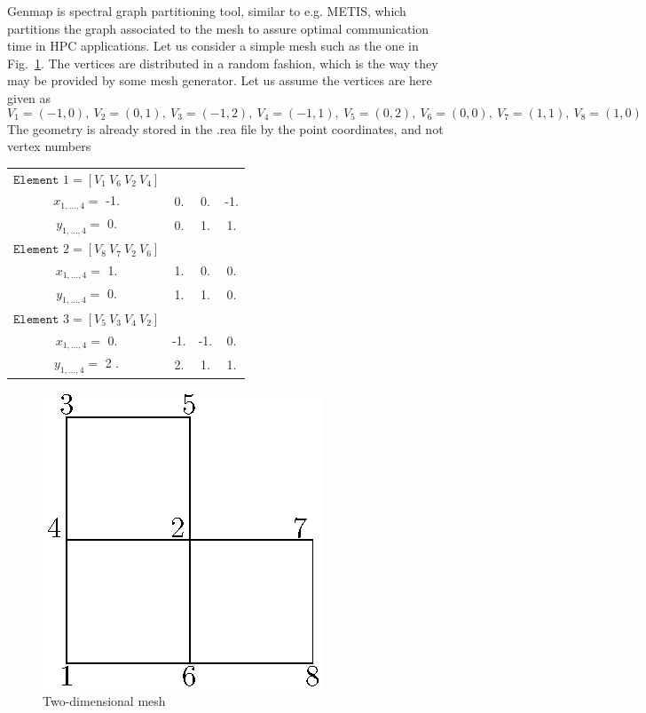 Genmap is spectral graph partitioning tool, similar to e.g. METIS, which partitions the graph associated to the mesh to assure optimal communication time in HPC applications. Let us consider a simple mesh such as the one in Fig.~\ref{fig:genmap}. The vertices are distributed in a random fashion, which is the way they may be provided by some mesh generator. Let us assume the vertices are here given as 
\[V_1=(-1,0),\ V_2=(0,1),\ V_3=(-1,2),\ V_4=(-1,1),\ V_5=(0,2),\ V_6=(0,0),\ V_7=(1,1),\ V_8=(1,0)\] 
The geometry is already stored in the .rea file by the point coordinates, and not vertex numbers
\begin{tabular}{c c c c}
  \(\texttt{Element } 1=[V_1\ V_6\ V_2\ V_4]\)&&&\\
  \(x_{1,\ldots,4}=\) -1. & 0. & 0. & -1.\\
  \(y_{1,\ldots,4}=\) 0.  & 0. & 1. &1.\\
  \(\texttt{Element } 2=[V_8\ V_7\ V_2\ V_6]\)&&&\\
  \(x_{1,\ldots,4}=\) 1. & 1. & 0. & 0.\\
  \(y_{1,\ldots,4}=\) 0. & 1. & 1. &0.\\
  \(\texttt{Element } 3=[V_5\ V_3\ V_4\ V_2]\)&&&\\
  \(x_{1,\ldots,4}=\) 0. & -1. & -1. & 0.\\
  \(y_{1,\ldots,4}=\) 2 .& 2.  & 1.  &1.\\
  \end{tabular}

\begin{figure}
\centering
\includegraphics[scale=1]{Figs/genmap_sketch}
\caption{Two-dimensional mesh}
\label{fig:genmap}
\end{figure}

